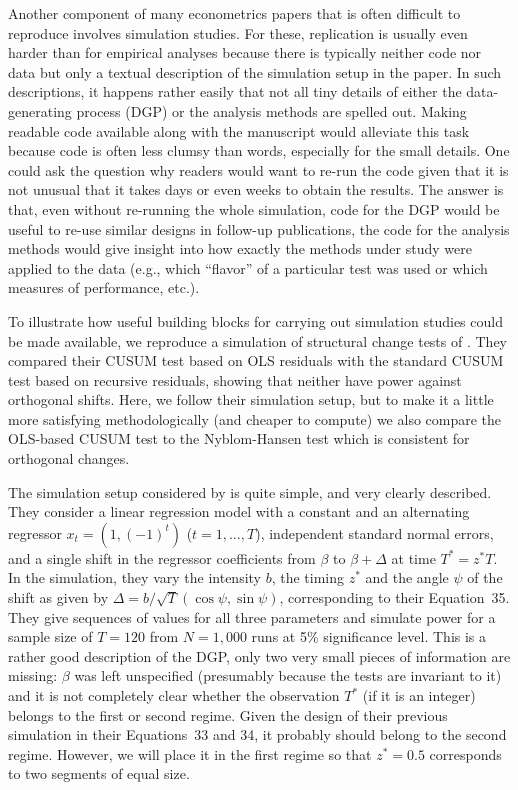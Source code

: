 \documentclass[10pt,a4paper,twoside]{article}
\begin{document}
Another component of many econometrics papers that is often difficult to reproduce
involves simulation studies.  For these, replication is usually even harder than for empirical
analyses because there is typically neither code nor data but only a textual description
of the simulation setup in the paper. In such descriptions, it happens rather easily
that not all tiny details of either the data-generating process (DGP) or the analysis
methods are spelled out. Making readable code available along with the manuscript would alleviate
this task because code is often less clumsy than words, especially for the small details.
One could ask the question why readers would want to re-run the code given that it is not
unusual that it takes days or even weeks to obtain the results. The answer is that, even without
re-running the whole simulation, code
for the DGP would be useful to re-use similar designs in follow-up publications,
the code for the analysis methods would give insight into how exactly the methods under study
were applied to the data (e.g., which ``flavor'' of a particular test was used or which
measures of performance, etc.).

To illustrate how useful building blocks for carrying out simulation studies could be
made available, we reproduce a simulation of structural change tests 
of \cite{repro:Ploberger+Kraemer:1992}.  They compared their CUSUM test based on
OLS residuals with the standard CUSUM test based on recursive residuals,
showing that neither have power against orthogonal shifts. Here, we
follow their simulation setup, but to make it a little more satisfying methodologically
(and cheaper to compute) we also compare the OLS-based CUSUM test
to the Nyblom-Hansen test \citep{repro:Nyblom:1989,repro:Hansen:1992}
which is consistent for orthogonal changes.

The simulation setup considered by
\cite{repro:Ploberger+Kraemer:1992} is quite simple, and very clearly described.
They consider a linear regression model
with a constant and an alternating regressor $x_t = (1, (-1)^t)$ ($t = 1, \dots, T$),
independent standard normal errors, and a single shift in the regressor coefficients from
$\beta$ to $\beta + \Delta$ at time $T^* = z^* T$. In the simulation, they vary the intensity
$b$, the timing $z^*$ and the angle $\psi$ of the shift as given by
$\Delta = b/\sqrt{T} (\cos \psi, \sin \psi)$,
corresponding to their Equation~35. They give sequences of values for all three parameters
and simulate power for a sample size of $T = 120$ from $N = 1,000$ runs at 5\% significance
level. This is a rather good description of the DGP, only two very small pieces of 
information are missing: $\beta$ was left unspecified (presumably because the tests are invariant
to it) and it is not completely clear whether the observation $T^*$ (if it is an integer) belongs
to the first or second regime. Given the design of their previous simulation in their Equations~33
and 34, it probably should belong to the second regime. However, we will place it in the first
regime so that $z^* = 0.5$ corresponds to two segments of equal size.
\end{document}
